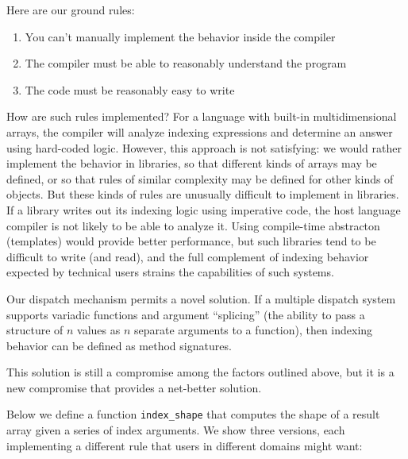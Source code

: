Here are our ground rules:

\begin{enumerate}
\item You can't manually implement the behavior inside the compiler
\item The compiler must be able to reasonably understand the program
\item The code must be reasonably easy to write
\end{enumerate}


How are such rules implemented? For a
language with built-in multidimensional arrays, the compiler will
analyze indexing expressions and determine an answer using hard-coded
logic.
However, this approach is not satisfying: we would rather
implement the behavior in libraries, so that different kinds of arrays
may be defined, or so that rules of similar complexity may be
defined for other kinds of objects. But these kinds of rules are
unusually difficult to implement in libraries. If a library writes out
its indexing logic using imperative code, the host language compiler
is not likely to be able to analyze it. Using compile-time abstracton
(templates) would provide better performance, but such libraries tend
to be difficult to write (and read), and the full complement of
indexing behavior expected by technical users strains the capabilities
of such systems.


Our dispatch mechanism permits a novel solution. If a multiple dispatch
system supports variadic functions and argument ``splicing'' (the ability
to pass a structure of $n$ values as $n$ separate arguments to a function),
then indexing behavior can be defined as method signatures.

This solution is still a compromise among the factors outlined above,
but it is a new compromise that provides a net-better solution.

Below we define a function \texttt{index\_shape} that computes the
shape of a result array given a series of index arguments. We show
three versions, each implementing a different rule that users in
different domains might want:


